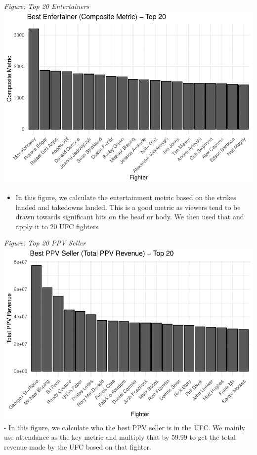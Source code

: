 \documentclass[
  man,floatsintext]{apa6}
\providecommand{\tightlist}{%
  \setlength{\itemsep}{0pt}\setlength{\parskip}{0pt}}
\begin{document}
\emph{Figure: Top 20 Entertainers}
\includegraphics{Into-the-UFC_files/figure-latex/unnamed-chunk-2-1.pdf}

\begin{itemize}
\tightlist
\item
  In this figure, we calculate the entertainment metric based on the strikes landed and takedowns landed. This is a good metric as viewers tend to be drawn towards significant hits on the head or body. We then used that and apply it to 20 UFC fighters
\end{itemize}

\emph{Figure: Top 20 PPV Seller}
\includegraphics{Into-the-UFC_files/figure-latex/unnamed-chunk-3-1.pdf}
- In this figure, we calculate who the best PPV seller is in the UFC. We mainly use attendance as the key metric and multiply that by 59.99 to get the total revenue made by the UFC based on that fighter.
\end{document}

